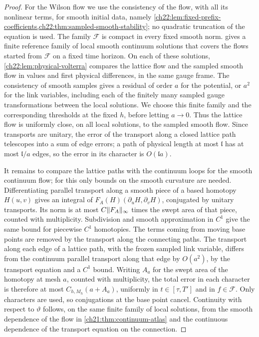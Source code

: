 \begin{proof}
For the Wilson flow we use the consistency of the flow, with all its nonlinear terms, for smooth initial data, namely \cref{ch22:lem:fixed-prefix-coefficients,ch22:thm:sampled-smooth-stability}; no quadratic truncation of the equation is used. The family $\mathscr F$ is compact in every fixed smooth norm.  gives a finite reference family of local smooth continuum solutions that covers the flows started from $\mathscr F$ on a fixed time horizon. On each of these solutions, \cref{ch22:lem:physical-volterra} compares the lattice flow and the sampled smooth flow in values and first physical differences, in the same gauge frame. The consistency of smooth samples gives a residual of order $a$ for the potential, or $a^2$ for the link variables, including each of the finitely many sampled gauge transformations between the local solutions. We choose this finite family and the corresponding thresholds at the fixed $h$, before letting $a\to0$. Thus the lattice flow is uniformly close, on all local solutions, to the sampled smooth flow. Since transports are unitary, the error of the transport along a closed lattice path telescopes into a sum of edge errors; a path of physical length at most $\mathfrak l$ has at most $\mathfrak l/a$ edges, so the error in its character is $O(\mathfrak la)$.

It remains to compare the lattice paths with the continuum loops for the smooth continuum flow; for this only bounds on the smooth curvature are needed. Differentiating parallel transport along a smooth piece of a based homotopy $H(u,v)$ gives an integral of $F_A(H)(\partial_uH,\partial_vH)$, conjugated by unitary transports. Its norm is at most $C\lVert F_A\rVert_\infty$ times the swept area of that piece, counted with multiplicity. Subdivision and smooth approximation in $C^1$ give the same bound for piecewise $C^1$ homotopies. The terms coming from moving base points are removed by the transport along the connecting paths. The transport along each edge of a lattice path, with the frozen sampled link variable, differs from the continuum parallel transport along that edge by $O(a^2)$, by the transport equation and a $C^1$ bound. Writing $A_a$ for the swept area of the homotopy at mesh $a$, counted with multiplicity, the total error in each character is therefore at most $C_{h,M_h}(a+A_a)$, uniformly in $t\in[\tau,T']$ and in $f\in\mathscr F$. Only characters are used, so conjugations at the base point cancel. Continuity with respect to $\vartheta$ follows, on the same finite family of local solutions, from the smooth dependence of the flow in \cref{ch21:thm:continuum-atlas} and the continuous dependence of the transport equation on the connection.
\end{proof}


